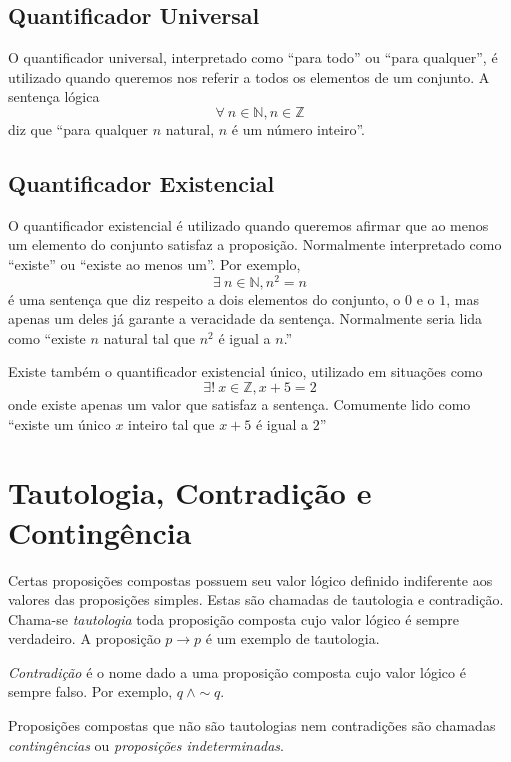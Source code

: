 \subsection*{Quantificador Universal}
O quantificador universal, interpretado como ``para todo'' ou ``para qualquer'', é utilizado quando queremos nos referir a todos os elementos de um conjunto. A sentença lógica \[\forall \ n \in \mathbb{N}, n \in \mathbb{Z}\] diz que ``para qualquer $n$ natural, $n$ é um número inteiro''.

\subsection*{Quantificador Existencial}
O quantificador existencial é utilizado quando queremos afirmar que ao menos um elemento do conjunto satisfaz a proposição. Normalmente interpretado como ``existe'' ou ``existe ao menos um''. Por exemplo, \[\exists \ n \in \mathbb{N}, n^2=n\] é uma sentença que diz respeito a dois elementos do conjunto, o $0$ e o $1$, mas apenas um deles já garante a veracidade da sentença. Normalmente seria lida como ``existe $n$ natural tal que $n^2$ é igual a $n$.''\par 
Existe também o quantificador existencial único, utilizado em situações como \[\exists ! \ x \in \mathbb{Z}, x+5=2\] onde existe apenas um valor que satisfaz a sentença. Comumente lido como ``existe um único $x$ inteiro tal que $x+5$ é igual a $2$''

\section{Tautologia, Contradição e Contingência}
Certas proposições compostas possuem seu valor lógico definido indiferente aos valores das proposições simples. Estas são chamadas de tautologia e contradição.
Chama-se \emph{tautologia} toda proposição composta cujo valor lógico é sempre verdadeiro. A proposição $p \rightarrow p$ é um exemplo de tautologia. \par 
\emph{Contradição} é o nome dado a uma proposição composta cujo valor lógico é sempre falso. Por exemplo, $q \: \wedge \sim \! q$.\par 
Proposições compostas que não são tautologias nem contradições são chamadas \emph{contingências} ou \emph{proposições indeterminadas}.

